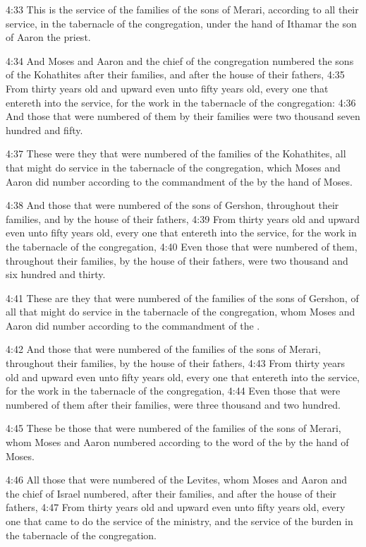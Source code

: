4:33 This is the service of the families of the sons of Merari,
according to all their service, in the tabernacle of the congregation,
under the hand of Ithamar the son of Aaron the priest.

4:34 And Moses and Aaron and the chief of the congregation numbered
the sons of the Kohathites after their families, and after the house
of their fathers, 4:35 From thirty years old and upward even unto
fifty years old, every one that entereth into the service, for the
work in the tabernacle of the congregation: 4:36 And those that were
numbered of them by their families were two thousand seven hundred and
fifty.

4:37 These were they that were numbered of the families of the
Kohathites, all that might do service in the tabernacle of the
congregation, which Moses and Aaron did number according to the
commandment of the \LORD by the hand of Moses.

4:38 And those that were numbered of the sons of Gershon, throughout
their families, and by the house of their fathers, 4:39 From thirty
years old and upward even unto fifty years old, every one that
entereth into the service, for the work in the tabernacle of the
congregation, 4:40 Even those that were numbered of them, throughout
their families, by the house of their fathers, were two thousand and
six hundred and thirty.

4:41 These are they that were numbered of the families of the sons of
Gershon, of all that might do service in the tabernacle of the
congregation, whom Moses and Aaron did number according to the
commandment of the \LORD.

4:42 And those that were numbered of the families of the sons of
Merari, throughout their families, by the house of their fathers, 4:43
From thirty years old and upward even unto fifty years old, every one
that entereth into the service, for the work in the tabernacle of the
congregation, 4:44 Even those that were numbered of them after their
families, were three thousand and two hundred.

4:45 These be those that were numbered of the families of the sons of
Merari, whom Moses and Aaron numbered according to the word of the
\LORD by the hand of Moses.

4:46 All those that were numbered of the Levites, whom Moses and Aaron
and the chief of Israel numbered, after their families, and after the
house of their fathers, 4:47 From thirty years old and upward even
unto fifty years old, every one that came to do the service of the
ministry, and the service of the burden in the tabernacle of the
congregation.

